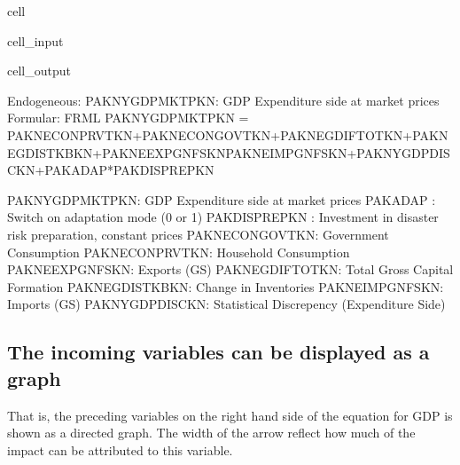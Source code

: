 \documentclass[letterpaper,10pt,english]{jupyterBook}
\begin{document}
\begin{sphinxuseclass}{cell}\begin{sphinxVerbatimInput}

\begin{sphinxuseclass}{cell_input}
\begin{sphinxVerbatim}[commandchars=\\\{\}]
\end{sphinxVerbatim}

\end{sphinxuseclass}\end{sphinxVerbatimInput}
\begin{sphinxVerbatimOutput}

\begin{sphinxuseclass}{cell_output}
\begin{sphinxVerbatim}[commandchars=\\\{\}]
Endogeneous: PAKNYGDPMKTPKN: GDP Expenditure side at market prices
Formular: FRML  \PYGZlt{}\PYGZgt{} PAKNYGDPMKTPKN = PAKNECONPRVTKN+PAKNECONGOVTKN+PAKNEGDIFTOTKN+PAKNEGDISTKBKN+PAKNEEXPGNFSKN\PYGZhy{}PAKNEIMPGNFSKN+PAKNYGDPDISCKN+PAKADAP*PAKDISPREPKN \PYGZdl{}

PAKNYGDPMKTPKN: GDP Expenditure side at market prices
PAKADAP       : Switch on adaptation mode (0 or 1)
PAKDISPREPKN  : Investment in disaster risk preparation, constant prices
PAKNECONGOVTKN: Government Consumption
PAKNECONPRVTKN: Household Consumption
PAKNEEXPGNFSKN: Exports (G\PYGZam{}S)
PAKNEGDIFTOTKN: Total Gross Capital Formation
PAKNEGDISTKBKN: Change in Inventories
PAKNEIMPGNFSKN: Imports (G\PYGZam{}S)
PAKNYGDPDISCKN: Statistical Discrepency (Expenditure Side)
\end{sphinxVerbatim}

\end{sphinxuseclass}\end{sphinxVerbatimOutput}

\end{sphinxuseclass}

\subsection{The incoming variables can be displayed as a graph}
\label{\detokenize{content/howto/structure/Logical_structure:the-incoming-variables-can-be-displayed-as-a-graph}}
\sphinxAtStartPar
That is, the preceding variables on the right hand side of the equation for GDP is shown as a directed graph. The width of the arrow reflect how much of the impact can be attributed to this variable.
\end{document}
